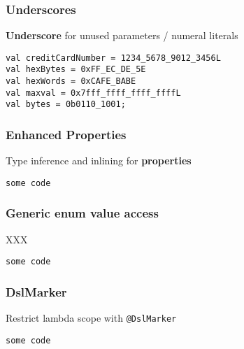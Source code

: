 
\begin{frame}[fragile] \frametitle{Underscores}
\textbf{Underscore} for unused parameters / numeral literals %
\begin{lstlisting}
val creditCardNumber = 1234_5678_9012_3456L
val hexBytes = 0xFF_EC_DE_5E
val hexWords = 0xCAFE_BABE
val maxval = 0x7fff_ffff_ffff_ffffL
val bytes = 0b0110_1001;
\end{lstlisting}
\end{frame}


\begin{frame}[fragile] \frametitle{Enhanced Properties}
Type inference and inlining for \textbf{properties} %
\begin{lstlisting}
some code
\end{lstlisting}
\end{frame}


\begin{frame}[fragile] \frametitle{Generic enum value access}
XXX
\begin{lstlisting}
some code
\end{lstlisting}
\end{frame}


\begin{frame}[fragile] \frametitle{DslMarker}
Restrict lambda scope with \texttt{@DslMarker}
\begin{lstlisting}
some code
\end{lstlisting}
\end{frame}


